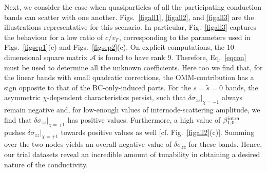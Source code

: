 \documentclass[aps,prb,onecolumn,nofootinbib,citeautoscript,10pt]{revtex4-2}
\begin{document}
Next, we consider the case when quasiparticles of all the participating conduction bands can scatter with one another. Figs.~\ref{figall1},  \ref{figall2}, and \ref{figall3} are the illustrations representative for this scenario. In particular, Fig.~\ref{figall3} captures the behaviour for a low ratio of $c/v_F$, corresponding to the parameters used in Figs.~\ref{figsep1}(c) and Figs.~\ref{figsep2}(c). On explicit computations, the $10$-dimensional square matrix $ \mathcal{A}$ is found to have rank $9$. Therefore, Eq.~\eqref{eqcon} must be used to determine all the unknown coefficients. Here too we find that, for the linear bands with small quadratic corrections, the OMM-contribution has a sign opposite to that of the BC-only-induced parts. For the $s = \tilde s = 0$ bands, the asymmetric $\chi$-dependent characteristics persist, such that $\delta \sigma_{zz} \vert_{\chi= -1}$ always remain negative and, for low-enough values of internode-scattering amplitude, we find that $\delta \sigma_{zz} \vert_{\chi= + 1}$ has positive values. Furthermore, a high value of $\beta^{\rm intra}_{1,0}  $ pushes $\delta \sigma_{zz} \vert_{\chi= + 1}$ towards positive values as well [cf. Fig.~\ref{figall2}(c)]. Summing over the two nodes yields an overall negative value of $\delta \sigma_{zz}$ for these bands. Hence, our trial datasets reveal an incredible amount of tunability in obtaining a desired nature of
the conductivity.
\end{document}
